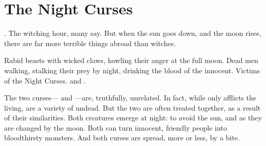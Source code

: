 \chapter{The Night Curses}

.
The witching hour, many say.
But when the sun goes down, and the moon rises, there are far more terrible things abroad than witches.

Rabid beasts with wicked claws, howling their anger at the full moon.
Dead men walking, stalking their prey by night, drinking the blood of the innocent.
Victims of the Night Curses.
{\werewolves} and {\vampires}.

The two curses---{\lycanthrophy} and {\vampirism}---are, truthfully, unrelated.
In fact, while {\lycanthrophy} only afflicts the living, {\vampires} are a variety of undead.
But the two are often treated together, as a result of their similarities.
Both creatures emerge at night: {\vampires} to avoid the sun, and {\werewolves} as they are changed by the moon.
Both can turn innocent, friendly people into bloodthirsty monsters.
And both curses are spread, more or less, by a bite.
